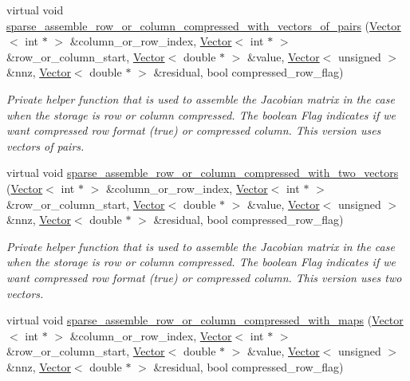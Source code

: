 \begin{DoxyCompactItemize}
virtual void \hyperlink{classoomph_1_1Problem_a3d5d5ac657381a2b2b077988e887fef8}{sparse\+\_\+assemble\+\_\+row\+\_\+or\+\_\+column\+\_\+compressed\+\_\+with\+\_\+vectors\+\_\+of\+\_\+pairs} (\hyperlink{classoomph_1_1Vector}{Vector}$<$ int $\ast$ $>$ \&column\+\_\+or\+\_\+row\+\_\+index, \hyperlink{classoomph_1_1Vector}{Vector}$<$ int $\ast$ $>$ \&row\+\_\+or\+\_\+column\+\_\+start, \hyperlink{classoomph_1_1Vector}{Vector}$<$ double $\ast$ $>$ \&value, \hyperlink{classoomph_1_1Vector}{Vector}$<$ unsigned $>$ \&nnz, \hyperlink{classoomph_1_1Vector}{Vector}$<$ double $\ast$ $>$ \&residual, bool compressed\+\_\+row\+\_\+flag)
\begin{DoxyCompactList}\small\item\em Private helper function that is used to assemble the Jacobian matrix in the case when the storage is row or column compressed. The boolean Flag indicates if we want compressed row format (true) or compressed column. This version uses vectors of pairs. \end{DoxyCompactList}\item 
virtual void \hyperlink{classoomph_1_1Problem_a767f7064ccbdcc2a039e0360b98dc48d}{sparse\+\_\+assemble\+\_\+row\+\_\+or\+\_\+column\+\_\+compressed\+\_\+with\+\_\+two\+\_\+vectors} (\hyperlink{classoomph_1_1Vector}{Vector}$<$ int $\ast$ $>$ \&column\+\_\+or\+\_\+row\+\_\+index, \hyperlink{classoomph_1_1Vector}{Vector}$<$ int $\ast$ $>$ \&row\+\_\+or\+\_\+column\+\_\+start, \hyperlink{classoomph_1_1Vector}{Vector}$<$ double $\ast$ $>$ \&value, \hyperlink{classoomph_1_1Vector}{Vector}$<$ unsigned $>$ \&nnz, \hyperlink{classoomph_1_1Vector}{Vector}$<$ double $\ast$ $>$ \&residual, bool compressed\+\_\+row\+\_\+flag)
\begin{DoxyCompactList}\small\item\em Private helper function that is used to assemble the Jacobian matrix in the case when the storage is row or column compressed. The boolean Flag indicates if we want compressed row format (true) or compressed column. This version uses two vectors. \end{DoxyCompactList}\item 
virtual void \hyperlink{classoomph_1_1Problem_ade9708e503889b48e0a1dbbe47906eba}{sparse\+\_\+assemble\+\_\+row\+\_\+or\+\_\+column\+\_\+compressed\+\_\+with\+\_\+maps} (\hyperlink{classoomph_1_1Vector}{Vector}$<$ int $\ast$ $>$ \&column\+\_\+or\+\_\+row\+\_\+index, \hyperlink{classoomph_1_1Vector}{Vector}$<$ int $\ast$ $>$ \&row\+\_\+or\+\_\+column\+\_\+start, \hyperlink{classoomph_1_1Vector}{Vector}$<$ double $\ast$ $>$ \&value, \hyperlink{classoomph_1_1Vector}{Vector}$<$ unsigned $>$ \&nnz, \hyperlink{classoomph_1_1Vector}{Vector}$<$ double $\ast$ $>$ \&residual, bool compressed\+\_\+row\+\_\+flag)

\end{DoxyCompactItemize}
